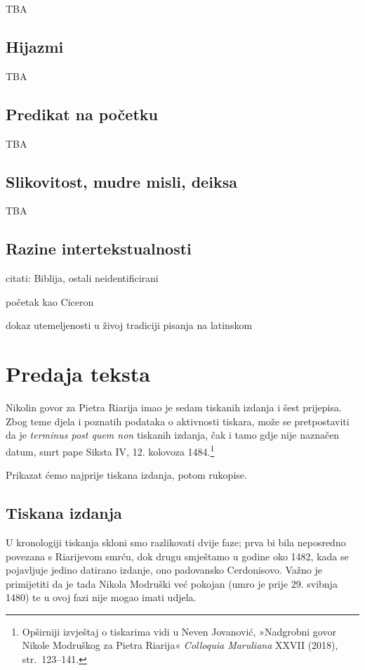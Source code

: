 \documentclass[a5paper,twoside]{article}
\begin{document}
TBA

\subsection{Hijazmi}

TBA


\subsection{Predikat na početku}

TBA

\subsection{Slikovitost, mudre misli, deiksa}

TBA

\subsection{Razine intertekstualnosti}

citati: Biblija, ostali neidentificirani

početak kao Ciceron

dokaz utemeljenosti u živoj tradiciji pisanja na latinskom

\section{Predaja teksta}

Nikolin govor za Pietra Riarija imao je sedam tiskanih izdanja i šest prijepisa.  Zbog teme djela i poznatih podataka o aktivnosti tiskara, može se pretpostaviti da je \textit{terminus post quem non} tiskanih izdanja, čak i tamo gdje nije naznačen datum, smrt pape Siksta IV, 12. kolovoza 1484.\footnote{Opširniji izvještaj o tiskarima vidi u Neven Jovanović, »Nadgrobni govor Nikole Modruškog za Pietra Riarija« \textit{Colloquia Maruliana} XXVII (2018), str.~123–141.}

Prikazat ćemo najprije tiskana izdanja, potom rukopise.

\subsection{Tiskana izdanja}

U kronologiji tiskanja skloni smo razlikovati dvije faze; prva bi bila neposredno povezana s Riarijevom smrću, dok drugu smještamo u godine oko 1482, kada se pojavljuje jedino datirano izdanje, ono padovansko Cerdonisovo. Važno je primijetiti da je tada Nikola Modruški već pokojan (umro je prije 29. svibnja 1480) te u ovoj fazi nije mogao imati udjela.
\end{document}

